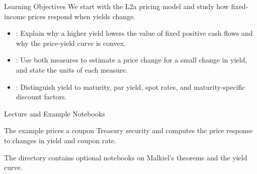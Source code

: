 \documentclass[aspectratio=169,11pt]{beamer}
\begin{document}
\begin{frame}{Learning Objectives}
  \vspace{0.4em}
  We start with the L2a pricing model and study how fixed-income prices respond
  when yields change.

  \vspace{0.9em}
  {\large\textbf{}}
  \vspace{0.4em}
  \begin{itemize}\setlength{\itemsep}{0.5em}
    \item {}: Explain why a higher yield lowers the value of
      fixed positive cash flows and why the price-yield curve is convex.
    \item {}: Use both measures to estimate a price
      change for a small change in yield, and state the units of each measure.
    \item {}: Distinguish yield to maturity, par yield, spot
      rates, and maturity-specific discount factors.
  \end{itemize}
  \vspace{-0.4em}

\end{frame}

\begin{frame}{Lecture and Example Notebooks}
  \vspace{0.5em}
  {\normalsize\textbf{} }

  \vspace{1.0em}
  {\normalsize\textbf{} }

  \vspace{1.0em}
  The example prices a coupon Treasury security and computes the price response
  to changes in yield and coupon rate.

  \vspace{0.8em}
  The  directory contains optional notebooks on Malkiel's
  theorems and the yield curve.

\end{frame}
\end{document}
